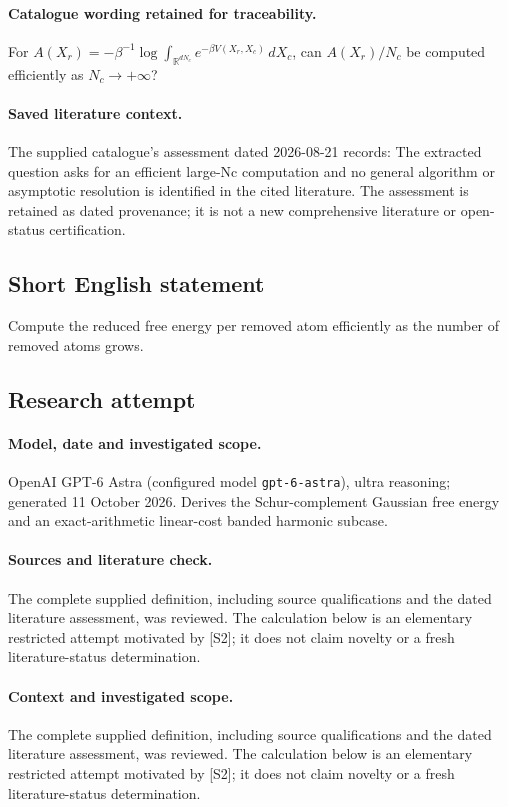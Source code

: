 \documentclass[11pt]{article}
\begin{document}
\paragraph{Catalogue wording retained for traceability.}
For $A(X_r)=-\beta^{-1}\log\int_{\mathbb R^{dN_c}}e^{-\beta V(X_r,X_c)}\,dX_c$, can $A(X_r)/N_c$ be computed efficiently as $N_c\to+\infty$?

\paragraph{Saved literature context.} The supplied catalogue's assessment dated 2026-08-21 records: The extracted question asks for an efficient large-Nc computation and no general algorithm or asymptotic resolution is identified in the cited literature. The assessment is retained as dated provenance; it is not a new comprehensive literature or open-status certification.
\subsection{Short English statement}
Compute the reduced free energy per removed atom efficiently as the number of removed atoms grows.
\subsection{Research attempt}
\paragraph{Model, date and investigated scope.}
OpenAI GPT-6 Astra (configured model \texttt{gpt-6-astra}), ultra reasoning; generated 11 October 2026. Derives the Schur-complement Gaussian free energy and an exact-arithmetic linear-cost banded harmonic subcase.

\paragraph{Sources and literature check.}
The complete supplied definition, including source qualifications and the dated literature assessment, was reviewed. The calculation below is an elementary restricted attempt motivated by [S2]; it does not claim novelty or a fresh literature-status determination.

\paragraph{Context and investigated scope.} The complete supplied definition, including source qualifications and the dated literature assessment, was reviewed. The calculation below is an elementary restricted attempt motivated by [S2]; it does not claim novelty or a fresh literature-status determination.
\end{document}
